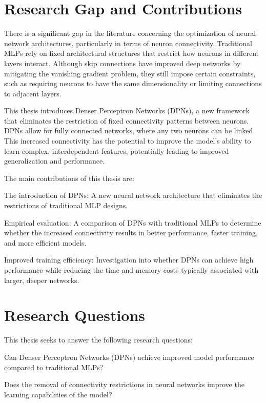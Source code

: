 \section{Research Gap and Contributions}

There is a significant gap in the literature concerning the optimization of neural network architectures, particularly in terms of neuron connectivity. Traditional MLPs rely on fixed architectural structures that restrict how neurons in different layers interact. Although skip connections have improved deep networks by mitigating the vanishing gradient problem, they still impose certain constraints, such as requiring neurons to have the same dimensionality or limiting connections to adjacent layers.

This thesis introduces Denser Perceptron Networks (DPNs), a new framework that eliminates the restriction of fixed connectivity patterns between neurons. DPNs allow for fully connected networks, where any two neurons can be linked. This increased connectivity has the potential to improve the model’s ability to learn complex, interdependent features, potentially leading to improved generalization and performance.

The main contributions of this thesis are:

The introduction of DPNs: A new neural network architecture that eliminates the restrictions of traditional MLP designs.

Empirical evaluation: A comparison of DPNs with traditional MLPs to determine whether the increased connectivity results in better performance, faster training, and more efficient models.

Improved training efficiency: Investigation into whether DPNs can achieve high performance while reducing the time and memory costs typically associated with larger, deeper networks.


\section{Research Questions}

This thesis seeks to answer the following research questions:

Can Denser Perceptron Networks (DPNs) achieve improved model performance compared to traditional MLPs?

Does the removal of connectivity restrictions in neural networks improve the learning capabilities of the model?


